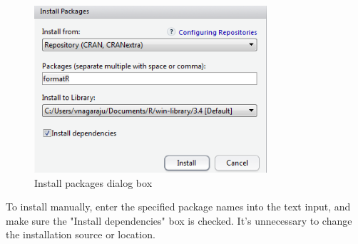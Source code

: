 \documentclass[conference]{IEEEtran}
\begin{document}
\begin{itemize}
{{        \begin{figure}[!h]
        \centering
        \includegraphics[width=3.4in]{Figures/InstallPackages}
        \caption{Install packages dialog box}
        \label{fig:InstallPackages}
        \end{figure}

        \noindent To install manually, enter the specified package names into the text input, and make sure the "Install dependencies" box is checked. It's unnecessary to change the installation source or location.}
      }
\end{itemize}
\end{document}
